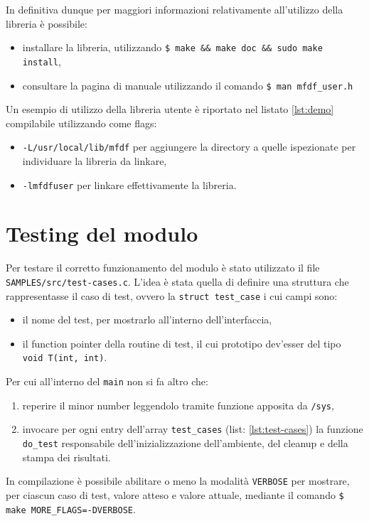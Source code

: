 \documentclass{article}
\newcommand{\terminal}[1]{\colorbox{tn-bg}{\textcolor{tn-fg}{\texttt{#1}}}}
\begin{document}
In definitiva dunque per maggiori informazioni relativamente all'utilizzo della libreria è possibile:
\begin{itemize}
        \item installare la libreria, utilizzando \terminal{\$ make \&\& make doc \&\& sudo make install},
        \item consultare la pagina di manuale utilizzando il comando \terminal{\$ man mfdf\_user.h}
\end{itemize}

Un esempio di utilizzo della libreria utente è riportato nel listato \ref{lst:demo} compilabile utilizzando come flags:
\begin{itemize}
        \item \texttt{-L/usr/local/lib/mfdf} per aggiungere la directory a quelle ispezionate per individuare la libreria da linkare,
        \item \texttt{-lmfdfuser} per linkare effettivamente la libreria.
\end{itemize}



\section{Testing del modulo}
Per testare il corretto funzionamento del modulo è stato utilizzato il file \texttt{SAMPLES/src/test-cases.c}. L'idea è stata quella di definire una struttura che rappresentasse il caso di test, ovvero la \texttt{struct test\_case} i cui campi sono:
\begin{itemize}
        \item il nome del test, per mostrarlo all'interno dell'interfaccia,
        \item il function pointer della routine di test, il cui prototipo dev'esser del tipo \texttt{void T(int, int)}.
\end{itemize}

Per cui all'interno del \texttt{main} non si fa altro che:
\begin{enumerate}
        \item reperire il minor number leggendolo tramite funzione apposita da \texttt{/sys},
        \item invocare per ogni entry dell'array \texttt{test\_cases} (list: \ref{lst:test-cases}) la funzione \texttt{do\_test} responsabile dell'inizializzazione dell'ambiente, del cleanup e della stampa dei risultati.
\end{enumerate}



In compilazione è possibile abilitare o meno la modalità \texttt{VERBOSE} per mostrare, per ciascun caso di test, valore atteso e valore attuale, mediante il comando \terminal{\$ make MORE\_FLAGS=-DVERBOSE}.
\end{document}
